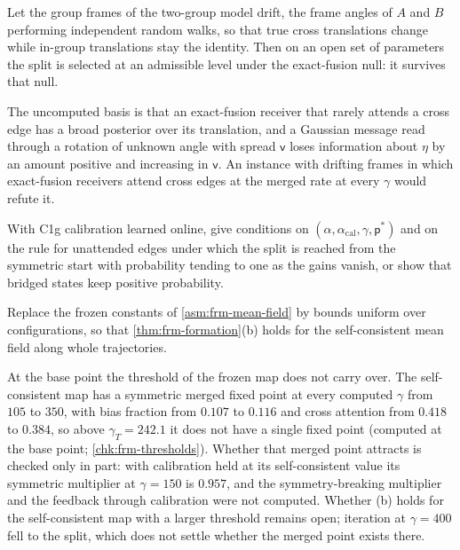 \begin{conjecture}\label{conj:frm-drifting-frames}
Let the group frames of the two-group model drift, the frame angles of $A$ and $B$ performing independent random walks, so that true cross translations change while in-group translations stay the identity. Then on an open set of parameters the split is selected at an admissible level under the exact-fusion null: it survives that null.
\end{conjecture}
The uncomputed basis is that an exact-fusion receiver that rarely attends a cross edge has a broad posterior over its translation, and a Gaussian message read through a rotation of unknown angle with spread $\mathsf v$ loses information about $\eta$ by an amount positive and increasing in $\mathsf v$. An instance with drifting frames in which exact-fusion receivers attend cross edges at the merged rate at every $\gamma$ would refute it.

\begin{openproblem}\label{open:frm-online}
With C1g calibration learned online, give conditions on $(\alpha,\alpha_{\mathrm{cal}},\gamma,\mathsf p^\ast)$ and on the rule for unattended edges under which the split is reached from the symmetric start with probability tending to one as the gains vanish, or show that bridged states keep positive probability.
\end{openproblem}

\begin{openproblem}\label{open:frm-self-consistent}
Replace the frozen constants of \cref{asm:frm-mean-field} by bounds uniform over configurations, so that \cref{thm:frm-formation}(b) holds for the self-consistent mean field along whole trajectories.
\end{openproblem}
At the base point the threshold of the frozen map does not carry over. The self-consistent map has a symmetric merged fixed point at every computed $\gamma$ from $105$ to $350$, with bias fraction from $0.107$ to $0.116$ and cross attention from $0.418$ to $0.384$, so above $\gamma_T=242.1$ it does not have a single fixed point (computed at the base point; \cref{chk:frm-thresholds}). Whether that merged point attracts is checked only in part: with calibration held at its self-consistent value its symmetric multiplier at $\gamma=150$ is $0.957$, and the symmetry-breaking multiplier and the feedback through calibration were not computed. Whether (b) holds for the self-consistent map with a larger threshold remains open; iteration at $\gamma=400$ fell to the split, which does not settle whether the merged point exists there.

